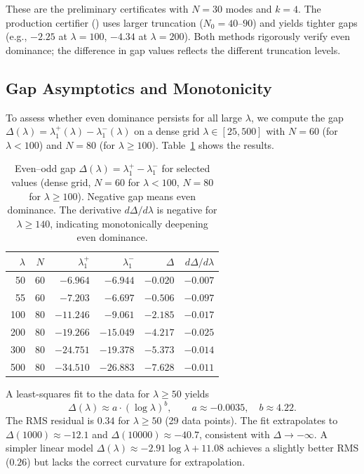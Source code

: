 \documentclass[12pt,a4paper]{article}
\theoremstyle{definition}
\theoremstyle{remark}
\begin{document}
\noindent These are the preliminary certificates with $N = 30$ modes and $k = 4$. The production certifier () uses larger truncation ($N_0 = 40$--$90$) and yields tighter gaps (e.g., $-2.25$ at $\lambda = 100$, $-4.34$ at $\lambda = 200$). Both methods rigorously verify even dominance; the difference in gap values reflects the different truncation levels.

\subsection{Gap Asymptotics and Monotonicity}
\label{sec:gap-asymptotics}

To assess whether even dominance persists for all large $\lambda$, we compute the gap $\Delta(\lambda) = \lambda_1^+(\lambda) - \lambda_1^-(\lambda)$ on a dense grid $\lambda \in [25, 500]$ with $N = 60$ (for $\lambda < 100$) and $N = 80$ (for $\lambda \geq 100$). Table~\ref{tab:gap-asymp} shows the results.

\begin{table}[h]
\centering
\small
\renewcommand{\arraystretch}{1.15}
\begin{tabular}{r|c|r|r|r|r}
$\lambda$ & $N$ & $\lambda_1^+$ & $\lambda_1^-$ & $\Delta$ & $d\Delta/d\lambda$ \\\hline
50  & 60 & $-6.964$ & $-6.944$ & $-0.020$ & $-0.007$ \\
55  & 60 & $-7.203$ & $-6.697$ & $-0.506$ & $-0.097$ \\
100 & 80 & $-11.246$ & $-9.061$ & $-2.185$ & $-0.017$ \\
200 & 80 & $-19.266$ & $-15.049$ & $-4.217$ & $-0.025$ \\
300 & 80 & $-24.751$ & $-19.378$ & $-5.373$ & $-0.014$ \\
500 & 80 & $-34.510$ & $-26.883$ & $-7.628$ & $-0.011$
\end{tabular}
\caption{Even--odd gap $\Delta(\lambda) = \lambda_1^+ - \lambda_1^-$ for selected values (dense grid, $N=60$ for $\lambda < 100$, $N=80$ for $\lambda \geq 100$). Negative gap means even dominance. The derivative $d\Delta/d\lambda$ is negative for $\lambda \geq 140$, indicating monotonically deepening even dominance.}
\label{tab:gap-asymp}
\end{table}

A least-squares fit to the data for $\lambda \geq 50$ yields
\begin{equation}
\label{eq:gap-fit}
\Delta(\lambda) \approx a \cdot (\log\lambda)^b, \qquad a \approx -0.0035,\quad b \approx 4.22.
\end{equation}
The RMS residual is $0.34$ for $\lambda \geq 50$ (29 data points). The fit extrapolates to $\Delta(1000) \approx -12.1$ and $\Delta(10000) \approx -40.7$, consistent with $\Delta \to -\infty$.
A simpler linear model $\Delta(\lambda) \approx -2.91 \log\lambda + 11.08$ achieves a slightly better RMS ($0.26$) but lacks the correct curvature for extrapolation.
\end{document}
